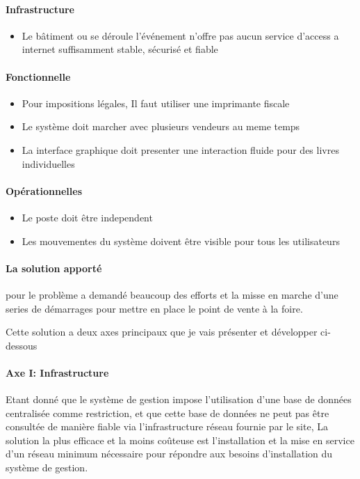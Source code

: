 \documentclass{resume} %
\begin{document}
		\paragraph{Infrastructure}
		\begin {itemize} 
			\item Le bâtiment ou se déroule l'événement n'offre pas aucun service d'access a internet suffisamment stable, sécurisé et fiable
		\end {itemize}
		\paragraph{Fonctionnelle}
		\begin {itemize} 
			\item Pour impositions légales, Il faut utiliser une imprimante fiscale 
			\item Le système doit marcher avec plusieurs vendeurs au meme temps
			\item La interface graphique doit presenter une interaction fluide pour des livres individuelles 
		\end {itemize}
		\paragraph{Opérationnelles}
		\begin {itemize} 
			\item Le poste doit être independent 
			\item Les mouvementes du système doivent être visible pour tous les utilisateurs
		\end {itemize}		

		
		
	   \paragraph{La solution apporté} pour le problème a demandé beaucoup des efforts et la misse en marche d'une series de démarrages pour mettre en place le point de vente à la foire.

	       Cette solution a deux axes principaux que je vais présenter et développer ci-dessous

	  	        
		\paragraph{Axe I: Infrastructure}
			Etant donné que le système de gestion impose l'utilisation d'une base de données centralisée comme restriction, et que cette base de données ne peut pas être consultée de manière fiable via l'infrastructure réseau fournie par le site,
La solution la plus efficace et la moins coûteuse est l'installation et la mise en service d'un réseau minimum nécessaire pour répondre aux besoins d'installation du système de gestion.
\end{document}
